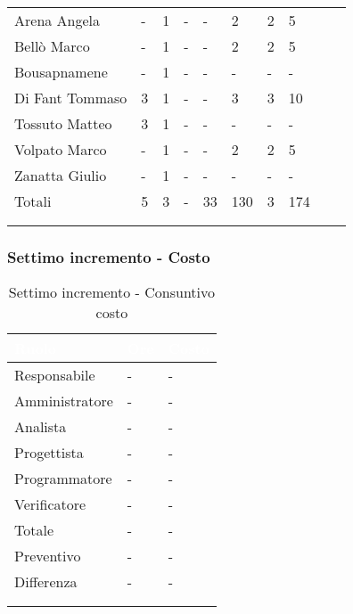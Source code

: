 {{{\begin{longtable}{C{.3\freewidth} C{.1\freewidth} C{.1\freewidth} C{.1\freewidth} C{.1\freewidth} C{.1\freewidth} C{.1\freewidth} C{.1\freewidth} C{.1\freewidth} C{.3\freewidth}}
            Arena Angela & - & 1 & - & - & 2 & 2 & 5\\      
            Bellò Marco & - & 1 & - & - & 2 & 2 & 5\\      
            Bousapnamene & - & 1 & - & - & - & - & -\\      
            Di Fant Tommaso & 3 & 1 & - & - & 3 & 3  & 10\\      
            Tossuto Matteo & 3 & 1 & - & - & - & -  & - \\      
            Volpato Marco & - & 1 & - & - & 2 & 2 &  5 \\      
            Zanatta Giulio & - & 1 & - & - & - & - & - \\      
            Totali & 5 & 3 & - & 33 & 130 & 3 & 174 \\
            \bottomrule
            \\
            \caption{}

            \end{longtable}
            }
            }
            \subsubsection{Settimo incremento - Costo} {
                \setlength{\freewidth}{\dimexpr\textwidth-30\tabcolsep}
                \renewcommand{\arraystretch}{1.0}
                \centering
                \setlength{\aboverulesep}{0pt}
                \setlength{\belowrulesep}{0pt}
                \begin{longtable}{C{.4\freewidth} C{.2\freewidth} C{.2\freewidth}}
                \toprule
                \textcolor{white}{\textbf{Ruolo}}&
                \textcolor{white}{\textbf{Ore}}&
                \textcolor{white}{\textbf{Costo}}\\
                \toprule
                \endhead
          
                Responsabile & - & - \\
                Amministratore & - & - \\
                Analista & - & - \\
                Progettista & - & - \\
                Programmatore & - & - \\
                Verificatore & - &- \\
                Totale & - & - \\
                Preventivo & - & - \\
                Differenza & - & - \\
                \bottomrule
                \\
                \caption{Settimo incremento - Consuntivo costo}
          

\end{longtable}}}
